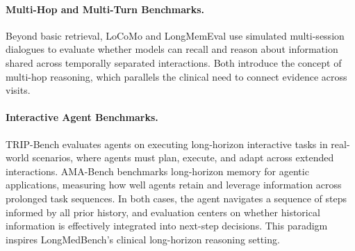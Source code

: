 \paragraph{Multi-Hop and Multi-Turn Benchmarks.} Beyond basic retrieval, LoCoMo \cite{maharana2024evaluating} and LongMemEval \cite{wu2024longmemeval} use simulated multi-session dialogues to evaluate whether models can recall and reason about information shared across temporally separated interactions. Both introduce the concept of multi-hop reasoning, which parallels the clinical need to connect evidence across visits.

\paragraph{Interactive Agent Benchmarks.} TRIP-Bench \cite{shen2026tripbenchbenchmarklonghorizoninteractive} evaluates agents on executing long-horizon interactive tasks in real-world scenarios, where agents must plan, execute, and adapt across extended interactions. AMA-Bench \cite{amabench2026} benchmarks long-horizon memory for agentic applications, measuring how well agents retain and leverage information across prolonged task sequences. In both cases, the agent navigates a sequence of steps informed by all prior history, and evaluation centers on whether historical information is effectively integrated into next-step decisions. This paradigm inspires LongMedBench's clinical long-horizon reasoning setting.

